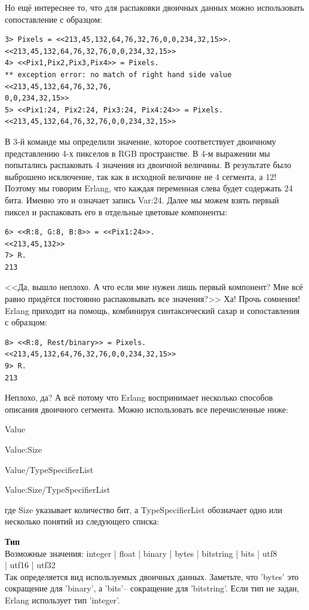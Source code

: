 \documentclass[a4paper,12pt]{report}
\newcommand{\ops}{\colorbox{lgreen}}
\begin{document}
Но ещё интереснее то, что для распаковки двоичных данных можно использовать сопоставление с образцом:
\begin{lstlisting}[style=repl]
3> Pixels = <<213,45,132,64,76,32,76,0,0,234,32,15>>.
<<213,45,132,64,76,32,76,0,0,234,32,15>>
4> <<Pix1,Pix2,Pix3,Pix4>> = Pixels.
** exception error: no match of right hand side value <<213,45,132,64,76,32,76,
0,0,234,32,15>>
5> <<Pix1:24, Pix2:24, Pix3:24, Pix4:24>> = Pixels.
<<213,45,132,64,76,32,76,0,0,234,32,15>>
\end{lstlisting}

В 3\--й команде мы определили значение, которое соответствует двоичному представлению 4\--х пикселов в RGB пространстве. В 4\--м выражении мы попытались распаковать 4 значения из двоичной величины. В результате было выброшено исключение, так как в исходной величине не 4 сегмента, а 12! Поэтому мы говорим Erlang, что каждая переменная слева будет содержать 24 бита. Именно это и означает запись \ops{Var:24}. Далее мы можем взять первый пиксел и распаковать его в отдельные цветовые компоненты:
\begin{lstlisting}[style=repl]
6> <<R:8, G:8, B:8>> = <<Pix1:24>>.
<<213,45,132>>
7> R.
213
\end{lstlisting}

<<Да, вышло неплохо. А что если мне нужен лишь первый компонент? Мне всё равно придётся постоянно распаковывать все значения?>> Ха! Прочь сомнения! Erlang приходит на помощь, комбинируя синтаксический сахар и сопоставления с образцом:
\begin{lstlisting}[style=repl]
8> <<R:8, Rest/binary>> = Pixels.
<<213,45,132,64,76,32,76,0,0,234,32,15>>
9> R.
213
\end{lstlisting}

Неплохо, да? А всё потому что Erlang воспринимает несколько способов описания двоичного сегмента. Можно использовать все перечисленные ниже:

Value

Value:Size

Value/TypeSpecifierList

Value:Size/TypeSpecifierList

где Size указывает количество бит, а TypeSpecifierList обозначает одно или несколько понятий из следующего списка:

\begin{minipage}{\textwidth}
\textbf{Тип}\\ 
Возможные значения: \ops{integer | float | binary | bytes | bitstring | bits | utf8}\\ 
\ops{| utf16 | utf32}\\  
Так определяется вид используемых двоичных данных. Заметьте, что 'bytes' это сокращение для 'binary', а 'bits'\--- сокращение для 'bitstring'. Если тип не задан, Erlang использует тип 'integer'.\\ 
\end{minipage}
\end{document}
